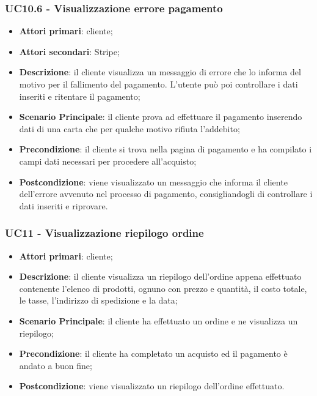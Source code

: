 \subsubsection{UC10.6 - Visualizzazione errore pagamento}
\begin{itemize}
\item \textbf{Attori primari}: cliente;
\item \textbf{Attori secondari}: Stripe;
\item \textbf{Descrizione}: il cliente visualizza un messaggio di errore che lo informa del motivo per il fallimento del pagamento. L'utente può poi controllare i dati inseriti e ritentare il pagamento;
\item \textbf{Scenario Principale}: il cliente prova ad effettuare il pagamento inserendo dati di una carta che per qualche motivo rifiuta l'addebito;
\item \textbf{Precondizione}: il cliente si trova nella pagina di pagamento e ha compilato i campi dati necessari per procedere all'acquisto;
\item \textbf{Postcondizione}: viene visualizzato un messaggio che informa il cliente dell'errore avvenuto nel processo di pagamento, consigliandogli di controllare i dati inseriti e riprovare.
\end{itemize}


\subsubsection{UC11 - Visualizzazione riepilogo ordine}
\begin{itemize}
\item \textbf{Attori primari}: cliente;
\item \textbf{Descrizione}: il cliente visualizza un riepilogo dell'ordine appena effettuato contenente l'elenco di prodotti, ognuno con prezzo e quantità, il costo totale, le tasse, l'indirizzo di spedizione e la data;
\item \textbf{Scenario Principale}: il cliente ha effettuato un ordine e ne visualizza un riepilogo;
\item \textbf{Precondizione}: il cliente ha completato un acquisto ed il pagamento è andato a buon fine;
\item \textbf{Postcondizione}: viene visualizzato un riepilogo dell'ordine effettuato.
\end{itemize}
